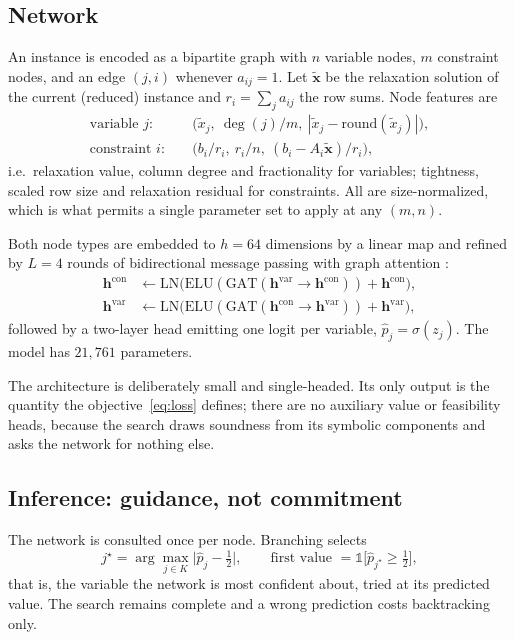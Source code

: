\documentclass[preprint,12pt]{elsarticle}
\begin{document}
\subsection{Network}
\label{sec:method-net}

An instance is encoded as a bipartite graph with $n$ variable nodes, $m$ constraint nodes, and an edge $(j,i)$ whenever $a_{ij}=1$. Let $\tilde{\mathbf{x}}$ be the relaxation solution of the current (reduced) instance and $r_i = \sum_j a_{ij}$ the row sums. Node features are
\begin{align}
\text{variable } j:&\quad \big(\tilde{x}_j,\ \deg(j)/m,\ |\tilde{x}_j - \mathrm{round}(\tilde{x}_j)|\big),\\
\text{constraint } i:&\quad \big(b_i/r_i,\ r_i/n,\ (b_i - A_i\tilde{\mathbf{x}})/r_i\big),
\end{align}
i.e.\ relaxation value, column degree and fractionality for variables; tightness, scaled row size and relaxation residual for constraints. All are size-normalized, which is what permits a single parameter set to apply at any $(m,n)$.

Both node types are embedded to $h=64$ dimensions by a linear map and refined by $L=4$ rounds of bidirectional message passing with graph attention \citep{velickovic2018graph}:
\begin{align}
\mathbf{h}^{\mathrm{con}} &\leftarrow \mathrm{LN}\big(\mathrm{ELU}(\mathrm{GAT}(\mathbf{h}^{\mathrm{var}}\!\to\!\mathbf{h}^{\mathrm{con}})) + \mathbf{h}^{\mathrm{con}}\big),\\
\mathbf{h}^{\mathrm{var}} &\leftarrow \mathrm{LN}\big(\mathrm{ELU}(\mathrm{GAT}(\mathbf{h}^{\mathrm{con}}\!\to\!\mathbf{h}^{\mathrm{var}})) + \mathbf{h}^{\mathrm{var}}\big),
\end{align}
followed by a two-layer head emitting one logit per variable, $\hat{p}_j = \sigma(z_j)$. The model has $21{,}761$ parameters.

The architecture is deliberately small and single-headed. Its only output is the quantity the objective~\eqref{eq:loss} defines; there are no auxiliary value or feasibility heads, because the search draws soundness from its symbolic components and asks the network for nothing else.

\subsection{Inference: guidance, not commitment}
\label{sec:method-inference}

The network is consulted once per node. Branching selects
\begin{equation}
j^\star = \arg\max_{j\in K} \big|\hat{p}_j - \tfrac12\big|,
\qquad
\text{first value } = \mathbb{1}\big[\hat{p}_{j^\star}\ge\tfrac12\big],
\end{equation}
that is, the variable the network is most confident about, tried at its predicted value. The search remains complete and a wrong prediction costs backtracking only.
\end{document}
